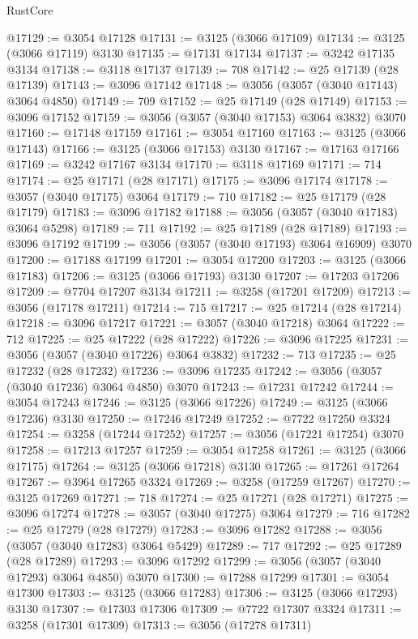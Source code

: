 \begin{lexlean}{RustCore}
\begin{coremodule}
@17129 := @3054 @17128
@17131 := @3125 (@3066 @17109)
@17134 := @3125 (@3066 @17119) @3130
@17135 := @17131 @17134
@17137 := @3242 @17135 @3134
@17138 := @3118 @17137
@17139 := 708
@17142 := @25 @17139 (@28 @17139)
@17143 := @3096 @17142
@17148 := @3056 (@3057 (@3040 @17143) @3064 @4850)
@17149 := 709
@17152 := @25 @17149 (@28 @17149)
@17153 := @3096 @17152
@17159 := @3056 (@3057 (@3040 @17153) @3064 @3832) @3070
@17160 := @17148 @17159
@17161 := @3054 @17160
@17163 := @3125 (@3066 @17143)
@17166 := @3125 (@3066 @17153) @3130
@17167 := @17163 @17166
@17169 := @3242 @17167 @3134
@17170 := @3118 @17169
@17171 := 714
@17174 := @25 @17171 (@28 @17171)
@17175 := @3096 @17174
@17178 := @3057 (@3040 @17175) @3064
@17179 := 710
@17182 := @25 @17179 (@28 @17179)
@17183 := @3096 @17182
@17188 := @3056 (@3057 (@3040 @17183) @3064 @5298)
@17189 := 711
@17192 := @25 @17189 (@28 @17189)
@17193 := @3096 @17192
@17199 := @3056 (@3057 (@3040 @17193) @3064 @16909) @3070
@17200 := @17188 @17199
@17201 := @3054 @17200
@17203 := @3125 (@3066 @17183)
@17206 := @3125 (@3066 @17193) @3130
@17207 := @17203 @17206
@17209 := @7704 @17207 @3134
@17211 := @3258 (@17201 @17209)
@17213 := @3056 (@17178 @17211)
@17214 := 715
@17217 := @25 @17214 (@28 @17214)
@17218 := @3096 @17217
@17221 := @3057 (@3040 @17218) @3064
@17222 := 712
@17225 := @25 @17222 (@28 @17222)
@17226 := @3096 @17225
@17231 := @3056 (@3057 (@3040 @17226) @3064 @3832)
@17232 := 713
@17235 := @25 @17232 (@28 @17232)
@17236 := @3096 @17235
@17242 := @3056 (@3057 (@3040 @17236) @3064 @4850) @3070
@17243 := @17231 @17242
@17244 := @3054 @17243
@17246 := @3125 (@3066 @17226)
@17249 := @3125 (@3066 @17236) @3130
@17250 := @17246 @17249
@17252 := @7722 @17250 @3324
@17254 := @3258 (@17244 @17252)
@17257 := @3056 (@17221 @17254) @3070
@17258 := @17213 @17257
@17259 := @3054 @17258
@17261 := @3125 (@3066 @17175)
@17264 := @3125 (@3066 @17218) @3130
@17265 := @17261 @17264
@17267 := @3964 @17265 @3324
@17269 := @3258 (@17259 @17267)
@17270 := @3125 @17269
@17271 := 718
@17274 := @25 @17271 (@28 @17271)
@17275 := @3096 @17274
@17278 := @3057 (@3040 @17275) @3064
@17279 := 716
@17282 := @25 @17279 (@28 @17279)
@17283 := @3096 @17282
@17288 := @3056 (@3057 (@3040 @17283) @3064 @5429)
@17289 := 717
@17292 := @25 @17289 (@28 @17289)
@17293 := @3096 @17292
@17299 := @3056 (@3057 (@3040 @17293) @3064 @4850) @3070
@17300 := @17288 @17299
@17301 := @3054 @17300
@17303 := @3125 (@3066 @17283)
@17306 := @3125 (@3066 @17293) @3130
@17307 := @17303 @17306
@17309 := @7722 @17307 @3324
@17311 := @3258 (@17301 @17309)
@17313 := @3056 (@17278 @17311)

\end{coremodule}
\end{lexlean}

